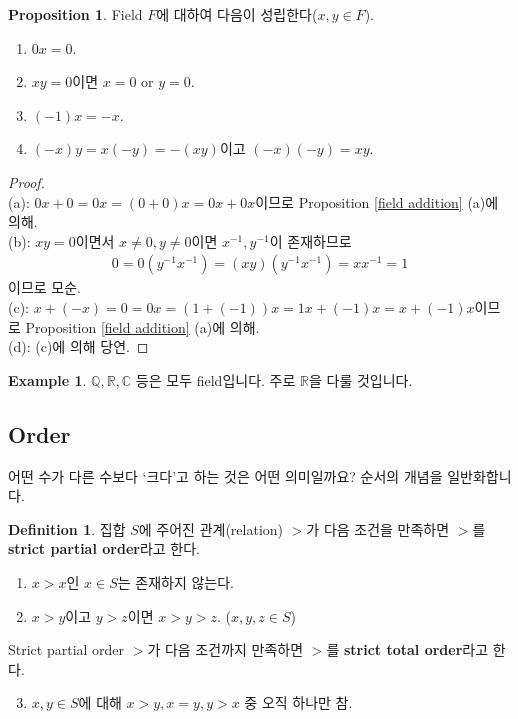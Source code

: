 \documentclass[12pt]{article}
\theoremstyle{definition}
\newtheorem{prop}[thm]{Proposition}
\newtheorem{defn}[thm]{Definition}
\newtheorem*{ex}{Example}
\def\QQ{\mathbb{Q}}
\def\RR{\mathbb{R}}
\def\CC{\mathbb{C}}
\begin{document}
	\begin{prop}
		Field \(F\)에 대하여 다음이 성립한다(\(x, y \in F\)).
		\begin{enumerate} [label=(\alph*), leftmargin=2\parindent]
			\item
			\(0x = 0\).
			\item
			\(xy = 0\)이면 \(x = 0\) or \(y = 0\).
			\item
			\((-1)x = -x\).
			\item
			\((-x)y = x(-y) = -(xy)\)이고 \((-x)(-y)=xy\).
		\end{enumerate}
	\end{prop}
	\begin{proof}
		\quad\\
		(a): \(0x + 0 = 0x = (0+0)x = 0x + 0x\)이므로 Proposition \ref{field addition} (a)에 의해.\\
		(b): \(xy = 0\)이면서 \(x \neq 0, y \neq 0\)이면 \(x^{-1}, y^{-1}\)이 존재하므로
		\begin{gather*}
			0 = 0(y^{-1}x^{-1}) = (xy)(y^{-1}x^{-1}) = xx^{-1} = 1
		\end{gather*}
		이므로 모순.\\
		(c): \(x + (-x) = 0 = 0x = (1 + (-1))x = 1x + (-1)x = x + (-1)x\)이므로 Proposition \ref{field addition} (a)에 의해.\\
		(d): (c)에 의해 당연.
	\end{proof}

	\begin{ex}
		\(\QQ, \RR, \CC\) 등은 모두 field입니다. 주로 \(\RR\)을 다룰 것입니다.
	\end{ex}

\subsection{Order}

어떤 수가 다른 수보다 `크다'고 하는 것은 어떤 의미일까요? 순서의 개념을 일반화합니다.

	\begin{defn}
		집합 \(S\)에 주어진 관계(relation) \(>\)가 다음 조건을 만족하면 \(>\)를 \textbf{strict partial order}라고 한다.
		\begin{enumerate} [label=(\alph*), leftmargin=2\parindent]
			\item
			\(x > x\)인 \(x \in S\)는 존재하지 않는다.
			\item
			\(x > y\)이고 \(y > z\)이면 \(x > y > z\). (\(x, y, z \in S\))
		\end{enumerate}
		Strict partial order \(>\)가 다음 조건까지 만족하면 \(>\)를 \textbf{strict total order}라고 한다.
		\begin{enumerate}[label=(\alph*), leftmargin=2\parindent]
			\setcounter{enumi}{2}
			\item
			\(x, y \in S\)에 대해 \(x > y, x = y, y > x\) 중 오직 하나만 참.
		\end{enumerate}
	\end{defn}
\end{document}
